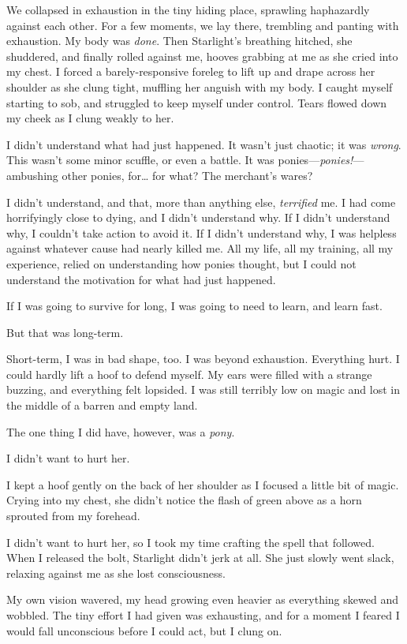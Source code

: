 We collapsed in exhaustion in the tiny hiding place, sprawling haphazardly against each other. For a few moments, we lay there, trembling and panting with exhaustion. My body was \textit{done}. Then Starlight’s breathing hitched, she shuddered, and finally rolled against me, hooves grabbing at me as she cried into my chest. I forced a barely-responsive foreleg to lift up and drape across her shoulder as she clung tight, muffling her anguish with my body. I caught myself starting to sob, and struggled to keep myself under control. Tears flowed down my cheek as I clung weakly to her.

I didn’t understand what had just happened. It wasn’t just chaotic; it was \textit{wrong}. This wasn’t some minor scuffle, or even a battle. It was ponies—\textit{ponies!}—ambushing other ponies, for… for what? The merchant’s wares?

I didn’t understand, and that, more than anything else, \textit{terrified} me. I had come horrifyingly close to dying, and I didn’t understand why. If I didn’t understand why, I couldn’t take action to avoid it. If I didn’t understand why, I was helpless against whatever cause had nearly killed me. All my life, all my training, all my experience, relied on understanding how ponies thought, but I could not understand the motivation for what had just happened.

If I was going to survive for long, I was going to need to learn, and learn fast.

But that was long-term.

Short-term, I was in bad shape, too. I was beyond exhaustion. Everything hurt. I could hardly lift a hoof to defend myself. My ears were filled with a strange buzzing, and everything felt lopsided. I was still terribly low on magic and lost in the middle of a barren and empty land.

The one thing I did have, however, was a \textit{pony}.

I didn’t want to hurt her.

I kept a hoof gently on the back of her shoulder as I focused a little bit of magic. Crying into my chest, she didn’t notice the flash of green above as a horn sprouted from my forehead.

I didn’t want to hurt her, so I took my time crafting the spell that followed. When I released the bolt, Starlight didn’t jerk at all. She just slowly went slack, relaxing against me as she lost consciousness.

My own vision wavered, my head growing even heavier as everything skewed and wobbled. The tiny effort I had given was exhausting, and for a moment I feared I would fall unconscious before I could act, but I clung on.

